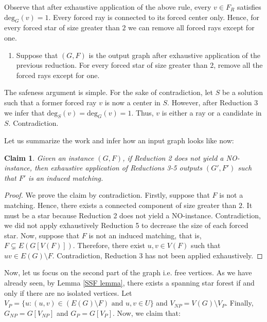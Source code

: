 \documentclass[en]{pracamgr}
\newtheorem{claim}{Claim}
\newcommand{\degree}[2]{\textrm{deg}_{#1}(#2)}
\begin{document}
Observe that after exhaustive application of the above rule, every $v \in F_R$ satisfies $\degree{G}{v}=1$. Every forced ray is connected to its forced center only. Hence, for every forced star of size greater than $2$ we can remove all forced rays except for one.

\begin{enumerate}[leftmargin=*,label=\textbf{Reduction \arabic{enumi}},resume,wide, labelwidth=!, labelindent=0pt]
	\item Suppose that $(G,F)$ is the output graph after exhaustive application of the previous reduction. For every forced star of size greater than $2$, remove all the forced rays except for one.
\end{enumerate}

The safeness argument is simple. For the sake of contradiction, let $S$ be a solution such that a former forced ray $v$ is now a center in $S$. However, after Reduction 3 we infer that $\degree{S}{v} = \degree{G}{v} = 1$. Thus, $v$ is either a ray or a candidate in $S$. Contradiction.

Let us summarize the work and infer how an input graph looks like now:

\begin{claim}
	Given an instance $(G,F)$, if Reduction 2 does not yield a NO-instance, then exhaustive application of Reductions 3-5 outputs $(G',F')$ such that $F'$ is an induced matching.
\end{claim}

\begin{proof}
	We prove the claim by contradiction. Firstly, suppose that $F$ is not a matching. Hence, there exists a connected component of size greater than $2$. It must be a star because Reduction 2 does not yield a NO-instance. Contradiction, we did not apply exhaustively Reduction 5 to decrease the size of each forced star. Now, suppose that $F$ is not an induced matching, that is, $F \subsetneq E(G[V(F)])$. Therefore, there exist $u,v \in V(F)$ such that $uv \in E(G) \setminus F$. Contradiction, Reduction 3 has not been applied exhaustively.
\end{proof}

Now, let us focus on the second part of the graph i.e. free vertices. As we have already seen, by Lemma \ref{SSF lemma}, there exists a spanning star forest if and only if there are no isolated vertices. Let $V_P = \{u: (u,v) \in (E(G) \setminus F) \text{ and } u,v \in U\}$ and $V_{NP} = V(G) \setminus V_P$. Finally, $G_{NP} = G[V_{NP}]$ and $G_P = G[V_P]$. Now, we claim that:
\end{document}
